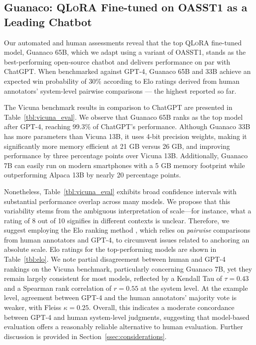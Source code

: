 \subsection{\textbf{Guanaco}: \textsc{QLoRA} Fine-tuned on OASST1 as a Leading Chatbot} Our automated and human assessments reveal that the top \textsc{QLoRA} fine-tuned model, {Guanaco} 65B, which we adapt using a variant of OASST1, stands as the best-performing open-source chatbot and delivers performance on par with ChatGPT. When benchmarked against GPT-4, {Guanaco} 65B and 33B achieve an expected win probability of 30\% according to Elo ratings derived from human annotators’ system-level pairwise comparisons — the highest reported so far.

The Vicuna benchmark \cite{vicuna2023} results in comparison to ChatGPT are presented in Table~\ref{tbl:vicuna_eval}. We observe that {Guanaco} 65B ranks as the top model after GPT-4, reaching 99.3\% of ChatGPT’s performance. Although {Guanaco} 33B has more parameters than Vicuna 13B, it uses 4-bit precision weights, making it significantly more memory efficient at 21 GB versus 26 GB, and improving performance by three percentage points over Vicuna 13B. Additionally, {Guanaco} 7B can easily run on modern smartphones with a 5 GB memory footprint while outperforming Alpaca 13B by nearly 20 percentage points.

Nonetheless, Table~\ref{tbl:vicuna_eval} exhibits broad confidence intervals with substantial performance overlap across many models. We propose that this variability stems from the ambiguous interpretation of scale—for instance, what a rating of 8 out of 10 signifies in different contexts is unclear. Therefore, we suggest employing the Elo ranking method \citep{elo1967proposed}, which relies on \textit{pairwise} comparisons from human annotators and GPT-4, to circumvent issues related to anchoring an absolute scale. Elo ratings for the top-performing models are shown in Table~\ref{tbl:elo}. We note partial disagreement between human and GPT-4 rankings on the Vicuna benchmark, particularly concerning Guanaco 7B, yet they remain largely consistent for most models, reflected by a Kendall Tau of $\tau=0.43$ and a Spearman rank correlation of $r=0.55$ at the system level. At the example level, agreement between GPT-4 and the human annotators’ majority vote is weaker, with Fleiss $\kappa=0.25$. Overall, this indicates a moderate concordance between GPT-4 and human system-level judgments, suggesting that model-based evaluation offers a reasonably reliable alternative to human evaluation. Further discussion is provided in Section~\ref{ssec:considerations}.

